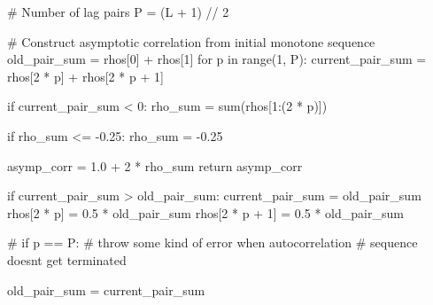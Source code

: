 \documentclass[
  letterpaper,
  DIV=11,
  numbers=noendperiod]{scrartcl}
\newenvironment{Shaded}{\begin{snugshade}}{\end{snugshade}}
\newcommand{\BuiltInTok}[1]{\textcolor[rgb]{0.00,0.23,0.31}{#1}}
\newcommand{\CommentTok}[1]{\textcolor[rgb]{0.37,0.37,0.37}{#1}}
\newcommand{\ControlFlowTok}[1]{\textcolor[rgb]{0.00,0.23,0.31}{#1}}
\newcommand{\DecValTok}[1]{\textcolor[rgb]{0.68,0.00,0.00}{#1}}
\newcommand{\FloatTok}[1]{\textcolor[rgb]{0.68,0.00,0.00}{#1}}
\newcommand{\KeywordTok}[1]{\textcolor[rgb]{0.00,0.23,0.31}{#1}}
\newcommand{\NormalTok}[1]{\textcolor[rgb]{0.00,0.23,0.31}{#1}}
\newcommand{\OperatorTok}[1]{\textcolor[rgb]{0.37,0.37,0.37}{#1}}
\begin{document}
\begin{Shaded}
\begin{Highlighting}[]
  \CommentTok{\# Number of lag pairs}
\NormalTok{  P }\OperatorTok{=}\NormalTok{ (L }\OperatorTok{+} \DecValTok{1}\NormalTok{) }\OperatorTok{//} \DecValTok{2}
  
  \CommentTok{\# Construct asymptotic correlation from initial monotone sequence}
\NormalTok{  old\_pair\_sum }\OperatorTok{=}\NormalTok{ rhos[}\DecValTok{0}\NormalTok{] }\OperatorTok{+}\NormalTok{ rhos[}\DecValTok{1}\NormalTok{]}
  \ControlFlowTok{for}\NormalTok{ p }\KeywordTok{in} \BuiltInTok{range}\NormalTok{(}\DecValTok{1}\NormalTok{, P):}
\NormalTok{    current\_pair\_sum }\OperatorTok{=}\NormalTok{ rhos[}\DecValTok{2} \OperatorTok{*}\NormalTok{ p] }\OperatorTok{+}\NormalTok{ rhos[}\DecValTok{2} \OperatorTok{*}\NormalTok{ p }\OperatorTok{+} \DecValTok{1}\NormalTok{]}
    
    \ControlFlowTok{if}\NormalTok{ current\_pair\_sum }\OperatorTok{\textless{}} \DecValTok{0}\NormalTok{:}
\NormalTok{      rho\_sum }\OperatorTok{=} \BuiltInTok{sum}\NormalTok{(rhos[}\DecValTok{1}\NormalTok{:(}\DecValTok{2} \OperatorTok{*}\NormalTok{ p)])}
      
      \ControlFlowTok{if}\NormalTok{ rho\_sum }\OperatorTok{\textless{}=} \OperatorTok{{-}}\FloatTok{0.25}\NormalTok{:}
\NormalTok{        rho\_sum }\OperatorTok{=} \OperatorTok{{-}}\FloatTok{0.25}
      
\NormalTok{      asymp\_corr }\OperatorTok{=} \FloatTok{1.0} \OperatorTok{+} \DecValTok{2} \OperatorTok{*}\NormalTok{ rho\_sum}
      \ControlFlowTok{return}\NormalTok{ asymp\_corr}
    
    \ControlFlowTok{if}\NormalTok{ current\_pair\_sum }\OperatorTok{\textgreater{}}\NormalTok{ old\_pair\_sum:}
\NormalTok{      current\_pair\_sum }\OperatorTok{=}\NormalTok{ old\_pair\_sum}
\NormalTok{      rhos[}\DecValTok{2} \OperatorTok{*}\NormalTok{ p]     }\OperatorTok{=} \FloatTok{0.5} \OperatorTok{*}\NormalTok{ old\_pair\_sum}
\NormalTok{      rhos[}\DecValTok{2} \OperatorTok{*}\NormalTok{ p }\OperatorTok{+} \DecValTok{1}\NormalTok{] }\OperatorTok{=} \FloatTok{0.5} \OperatorTok{*}\NormalTok{ old\_pair\_sum}

    \CommentTok{\# if p == P:}
      \CommentTok{\# throw some kind of error when autocorrelation}
      \CommentTok{\# sequence doesn\textquotesingle{}t get terminated}
    
\NormalTok{    old\_pair\_sum }\OperatorTok{=}\NormalTok{ current\_pair\_sum}
\end{Highlighting}
\end{Shaded}
\end{document}
